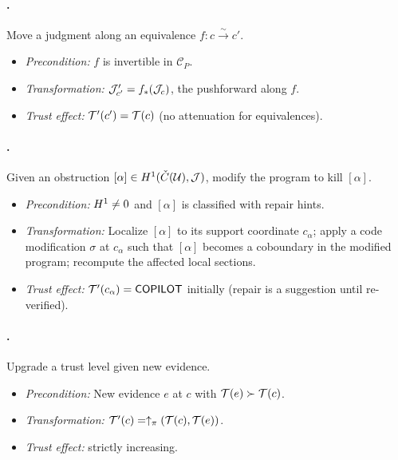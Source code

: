 \paragraph{\TRANSPORT.}
Move a judgment along an equivalence $f : c \xrightarrow{\sim} c'$.
\begin{itemize}[nosep]
  \item \emph{Precondition:}
        $f$ is invertible in $\mathcal{C}_P$.
  \item \emph{Transformation:}
        $\mathcal{J}'_{c'} = f_*(\mathcal{J}_c)$, the pushforward along $f$.
  \item \emph{Trust effect:}
        $\mathcal{T}'(c') = \mathcal{T}(c)$ (no attenuation for equivalences).
\end{itemize}

\paragraph{\REPAIR.}
Given an obstruction $[\alpha] \in H^{1}(\check{C}(\mathcal{U}), \mathcal{J})$,
modify the program to kill $[\alpha]$.
\begin{itemize}[nosep]
  \item \emph{Precondition:}
        $H^{1} \neq 0$ and $[\alpha]$ is classified with repair
        hints.
  \item \emph{Transformation:}
        Localize $[\alpha]$ to its support coordinate $c_\alpha$;
        apply a code modification $\sigma$ at $c_\alpha$ such that
        $[\alpha]$ becomes a coboundary in the modified program;
        recompute the affected local sections.
  \item \emph{Trust effect:}
        $\mathcal{T}'(c_\alpha) = \mathsf{COPILOT}$ initially (repair is a
        suggestion until re-verified).
\end{itemize}

\paragraph{\PROMOTE.}
Upgrade a trust level given new evidence.
\begin{itemize}[nosep]
  \item \emph{Precondition:}
        New evidence $e$ at $c$ with $\mathcal{T}(e) \succ \mathcal{T}(c)$.
  \item \emph{Transformation:}
        $\mathcal{T}'(c) = \uparrow_\pi(\mathcal{T}(c), \mathcal{T}(e))$.
  \item \emph{Trust effect:} strictly increasing.
\end{itemize}

